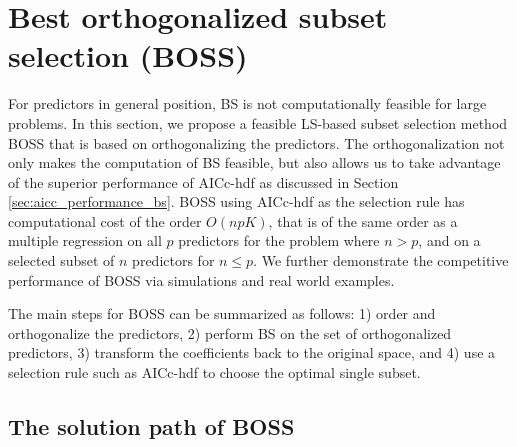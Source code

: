 \section{Best orthogonalized subset selection (BOSS)}
\label{sec:boss}

For predictors in general position, BS is not computationally feasible for large problems. In this section, we propose a feasible LS-based subset selection method BOSS that is based on orthogonalizing the predictors. The orthogonalization not only makes the computation of BS feasible, but also allows us to take advantage of the superior performance of AICc-hdf as discussed in Section \ref{sec:aicc_performance_bs}. BOSS using AICc-hdf as the selection rule has computational cost of the order $O(npK)$, that is of the same order as a multiple regression on all $p$ predictors for the problem where $n>p$, and on a selected subset of $n$ predictors for $n \le p$. We further demonstrate the competitive performance of BOSS via simulations and real world examples. 

The main steps for BOSS can be summarized as follows: 1) order and orthogonalize the predictors, 2) perform BS on the set of orthogonalized predictors, 3) transform the coefficients back to the original space, and 4) use a selection rule such as AICc-hdf to choose the optimal single subset. 

\subsection{The solution path of BOSS}
\label{sec:boss_solutionpath}

